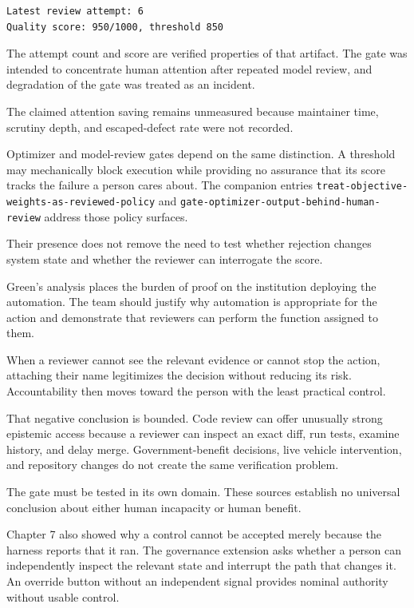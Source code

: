 \begin{verbatim}
Latest review attempt: 6
Quality score: 950/1000, threshold 850
\end{verbatim}

The attempt count and score are verified properties of that artifact. The gate was intended to concentrate human attention after repeated model review, and degradation of the gate was treated as an incident.

The claimed attention saving remains unmeasured because maintainer time, scrutiny depth, and escaped-defect rate were not recorded.

Optimizer and model-review gates depend on the same distinction. A threshold may mechanically block execution while providing no assurance that its score tracks the failure a person cares about. The companion entries \texttt{treat-objective-weights-as-reviewed-policy} and \texttt{gate-optimizer-output-behind-human-review} address those policy surfaces.

Their presence does not remove the need to test whether rejection changes system state and whether the reviewer can interrogate the score.

Green's analysis places the burden of proof on the institution deploying the automation. The team should justify why automation is appropriate for the action and demonstrate that reviewers can perform the function assigned to them.

When a reviewer cannot see the relevant evidence or cannot stop the action, attaching their name legitimizes the decision without reducing its risk. Accountability then moves toward the person with the least practical control.

That negative conclusion is bounded. Code review can offer unusually strong epistemic access because a reviewer can inspect an exact diff, run tests, examine history, and delay merge. Government-benefit decisions, live vehicle intervention, and repository changes do not create the same verification problem.

The gate must be tested in its own domain. These sources establish no universal conclusion about either human incapacity or human benefit.

Chapter 7 also showed why a control cannot be accepted merely because the harness reports that it ran. The governance extension asks whether a person can independently inspect the relevant state and interrupt the path that changes it. An override button without an independent signal provides nominal authority without usable control.

